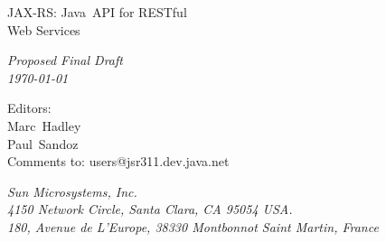 \begin{titlepage}
\raggedleft

\vspace*{60pt}

{\Huge
\textsf{JAX-RS: Java\texttrademark\ API for RESTful\\\vspace{10pt}
 Web Services}}

\vspace{20pt}

{
\Large\textit{Proposed Final Draft\\
\today}
}

\vspace{40pt}

{\large Editors:\\
Marc\ Hadley\\
Paul\ Sandoz\\
\vspace{10pt}Comments to: users@jsr311.dev.java.net
}

\vspace{80pt}

{\small\textit{Sun Microsystems, Inc.\\
4150 Network Circle, Santa Clara, CA 95054 USA.\\
180, Avenue de L'Europe, 38330 Montbonnot Saint Martin, France}
}
\end{titlepage} 
